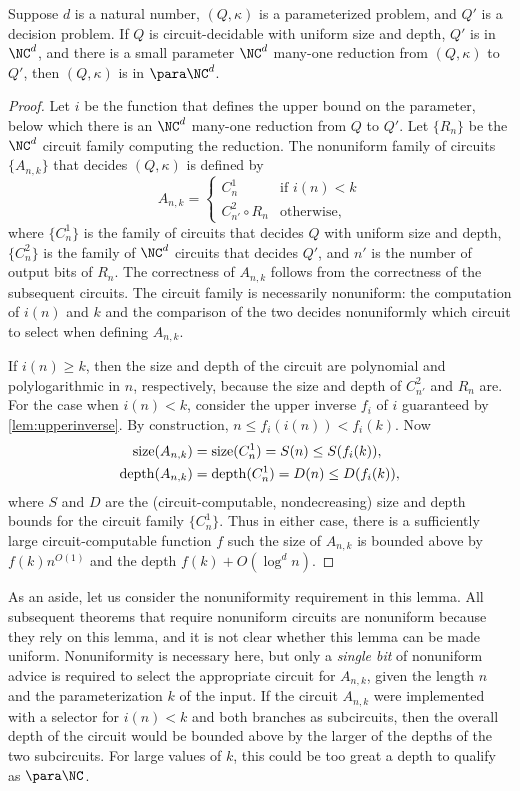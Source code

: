 \begin{lemma}\label{lem:spreduction}
  Suppose $d$ is a natural number, $(Q, \kappa)$ is a parameterized problem, and $Q'$ is a decision problem.
  If $Q$ is circuit-decidable with uniform size and depth, $Q'$ is in $\NC^d$, and there is a small parameter $\NC^d$ many-one reduction from $(Q, \kappa)$ to $Q'$, then $(Q, \kappa)$ is in $\para \NC^d$.
\end{lemma}
\begin{proof}
  Let $i$ be the function that defines the upper bound on the parameter, below which there is an $\NC^d$ many-one reduction from $Q$ to $Q'$.
  Let $\{R_n\}$ be the $\NC^d$ circuit family computing the reduction.
  The nonuniform family of circuits $\{A_{n, k}\}$ that decides $(Q, \kappa)$ is defined by
  \[
  A_{n, k} =
  \begin{cases}
    C_n^1 & \text{if } i(n) < k \\
    C_{n'}^2 \circ R_{n} & \text{otherwise},
  \end{cases}
  \]
  where $\{C_n^1\}$ is the family of circuits that decides $Q$ with uniform size and depth, $\{C_n^2\}$ is the family of $\NC^d$ circuits that decides $Q'$, and $n'$ is the number of output bits of $R_n$.
  The correctness of $A_{n, k}$ follows from the correctness of the subsequent circuits.
  The circuit family is necessarily nonuniform: the computation of $i(n)$ and $k$ and the comparison of the two decides nonuniformly which circuit to select when defining $A_{n, k}$.

  If $i(n) \geq k$, then the size and depth of the circuit are polynomial and polylogarithmic in $n$, respectively, because the size and depth of $C_{n'}^2$ and $R_n$ are.
  For the case when $i(n) < k$, consider the upper inverse $f_i$ of $i$ guaranteed by \autoref{lem:upperinverse}.
  By construction, $n \leq f_i(i(n)) < f_i(k)$.
  Now
  \begin{align*}
    \operatorname{size}(A_{n, k}) & = \operatorname{size}(C_n^1) = S(n) \leq S(f_i(k)), \\
    \operatorname{depth}(A_{n, k}) & = \operatorname{depth}(C_n^1) = D(n) \leq D(f_i(k)),
  \end{align*}
  where $S$ and $D$ are the (circuit-computable, nondecreasing) size and depth bounds for the circuit family $\{C_n^1\}$.
  Thus in either case, there is a sufficiently large circuit-computable function $f$ such the size of $A_{n, k}$ is bounded above by $f(k) n^{O(1)}$ and the depth $f(k) + O(\log^d n)$.
\end{proof}

As an aside, let us consider the nonuniformity requirement in this lemma.
All subsequent theorems that require nonuniform circuits are nonuniform because they rely on this lemma, and it is not clear whether this lemma can be made uniform.
Nonuniformity is necessary here, but only a \emph{single bit} of nonuniform advice is required to select the appropriate circuit for $A_{n, k}$, given the length $n$ and the parameterization $k$ of the input.
If the circuit $A_{n, k}$ were implemented with a selector for $i(n) < k$ and both branches as subcircuits, then the overall depth of the circuit would be bounded above by the larger of the depths of the two subcircuits.
For large values of $k$, this could be too great a depth to qualify as $\para \NC$.

